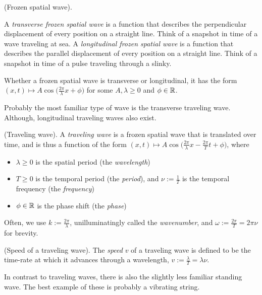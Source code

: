 \documentclass{article}
\begin{document}
\begin{defn}
	(Frozen spatial wave).
	
	A \textit{transverse frozen spatial wave} is a function that describes the perpendicular displacement of every position on a straight line. Think of a snapshot in time of a wave traveling at sea. A \textit{longitudinal frozen spatial wave} is a function that describes the parallel displacement of every position on a straight line. Think of a snapshot in time of a pulse traveling through a slinky.
	
	Whether a frozen spatial wave is transverse or longitudinal, it has the form $(x, t) \mapsto A\cos\Big(\frac{2\pi}{\lambda} x + \phi\Big)$ for some $A, \lambda \geq 0$ and $\phi \in \mathbb{R}$.
\end{defn}

Probably the most familiar type of wave is the transverse traveling wave. Although, longitudinal traveling waves also exist.

\begin{defn}
	(Traveling wave). A \textit{traveling wave} is a frozen spatial wave that is translated over time, and is thus a function of the form $(x, t) \mapsto A \cos\Big(\frac{2\pi}{\lambda}x - \frac{2\pi}{T} t + \phi\Big)$, where
	
	\begin{itemize}
		\item $\lambda \geq 0$ is the spatial period (the \textit{wavelength})
		\item $T \geq 0$ is the temporal period (the \textit{period}), and $\nu := \frac{1}{T}$ is the temporal frequency (the \textit{frequency})
		\item $\phi \in \mathbb{R}$ is the phase shift (the \textit{phase})
	\end{itemize}
	
	Often, we use $k := \frac{2\pi}{\lambda}$, unilluminatingly called the \textit{wavenumber}, and $\omega := \frac{2\pi}{T} = 2\pi \nu$ for brevity.
\end{defn}

\begin{defn}
	(Speed of a traveling wave). The \textit{speed} $v$ of a traveling wave is defined to be the time-rate at which it advances through a wavelength, $v := \frac{\lambda}{T} = \lambda \nu$.
\end{defn}

In contrast to traveling waves, there is also the slightly less familiar standing wave. The best example of these is probably a vibrating string.
\end{document}
